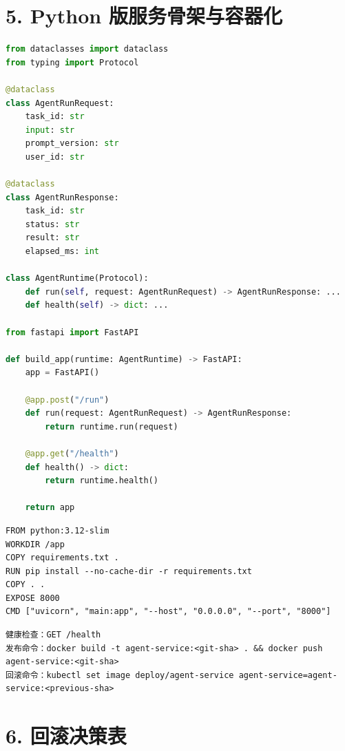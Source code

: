 \documentclass[9pt,a4paper,twocolumn]{ctexart}
\begin{document}
\section*{5. Python 版服务骨架与容器化}


\begin{lstlisting}[language=Python]
from dataclasses import dataclass
from typing import Protocol

@dataclass
class AgentRunRequest:
    task_id: str
    input: str
    prompt_version: str
    user_id: str

@dataclass
class AgentRunResponse:
    task_id: str
    status: str
    result: str
    elapsed_ms: int

class AgentRuntime(Protocol):
    def run(self, request: AgentRunRequest) -> AgentRunResponse: ...
    def health(self) -> dict: ...

from fastapi import FastAPI

def build_app(runtime: AgentRuntime) -> FastAPI:
    app = FastAPI()

    @app.post("/run")
    def run(request: AgentRunRequest) -> AgentRunResponse:
        return runtime.run(request)

    @app.get("/health")
    def health() -> dict:
        return runtime.health()

    return app
\end{lstlisting}



\begin{lstlisting}
FROM python:3.12-slim
WORKDIR /app
COPY requirements.txt .
RUN pip install --no-cache-dir -r requirements.txt
COPY . .
EXPOSE 8000
CMD ["uvicorn", "main:app", "--host", "0.0.0.0", "--port", "8000"]
\end{lstlisting}



\begin{lstlisting}
健康检查：GET /health
发布命令：docker build -t agent-service:<git-sha> . && docker push agent-service:<git-sha>
回滚命令：kubectl set image deploy/agent-service agent-service=agent-service:<previous-sha>
\end{lstlisting}



\section*{6. 回滚决策表}
\end{document}
